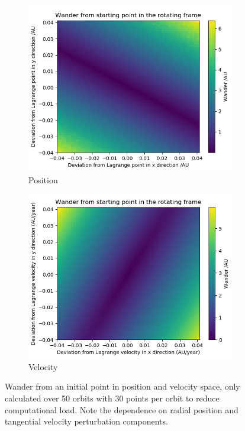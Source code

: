 \documentclass[11pt, a4paper,twocolumn]{article} %
\begin{document}
\begin{figure}[ht]
	\centering
	\begin{subfigure}{.45\textwidth}
		\centering
		\includegraphics[width=\linewidth]{Figures/testcolourmesh6}  
		\caption{Position}
		\label{fig:position_mesh}
	\end{subfigure}
	\hfill %
	\begin{subfigure}{.45\textwidth}
		\centering
		\includegraphics[width=\linewidth]{Figures/testvelocitymesh2}  
		\caption{Velocity}
		\label{fig:velocity_mesh}
	\end{subfigure}
	\caption{Wander from an initial point in position and velocity space, only calculated over 50 orbits with 30 points per orbit to reduce computational load. Note the dependence on radial position and tangential velocity perturbation components. }
	\label{fig:mesh_plots}
\end{figure}
\end{document}
